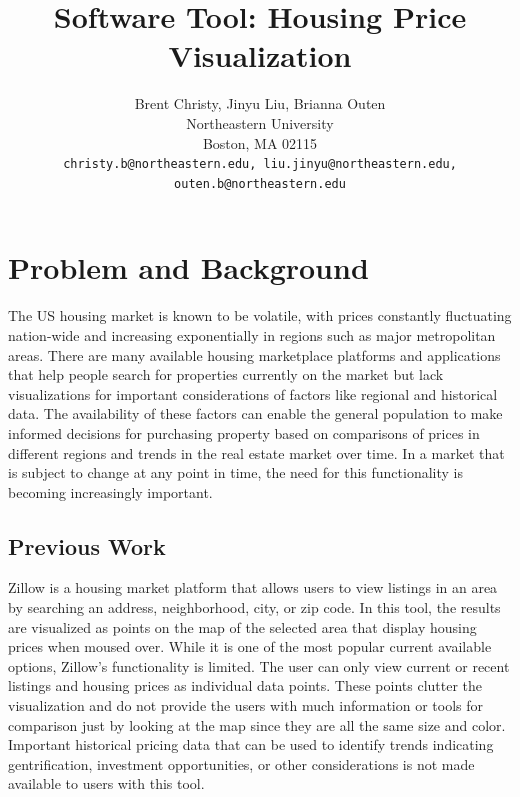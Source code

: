 \documentclass{article}
\title{Software Tool: Housing Price Visualization}
\author{%
  Brent Christy, Jinyu Liu, Brianna Outen \\
  Northeastern University\\
  Boston, MA 02115 \\
  \texttt{christy.b@northeastern.edu, liu.jinyu@northeastern.edu,} \\
  \texttt{outen.b@northeastern.edu} \\
}
\begin{document}
\maketitle

\section{Problem and Background}
The US housing market is known to be volatile, with prices constantly fluctuating nation-wide and increasing exponentially in regions such as major metropolitan
areas. There are many available housing marketplace platforms and applications that help people search for properties currently on the market but lack
visualizations for important considerations of factors like regional and historical data. The availability of these factors can enable the general population to
make informed decisions for purchasing property based on comparisons of prices in different regions and trends in the real estate market over time. In a market that is subject to change at any point in time, the need for this functionality is becoming increasingly important. 

\subsection{Previous Work}
Zillow is a housing market platform that allows users to view listings in an area by searching an address, neighborhood, city, or zip code. In this tool, the
results are visualized as points on the map of the selected area that display housing prices when moused over. While it is one of the most popular current
available options, Zillow’s functionality is limited. The user can only view current or recent listings and housing prices as individual data points. These points
clutter the visualization and do not provide the users with much information or tools for comparison just by looking at the map since they are all the same size
and color. Important historical pricing data that can be used to identify trends indicating gentrification, investment opportunities, or other considerations is not made available to users with this tool.
\end{document}
